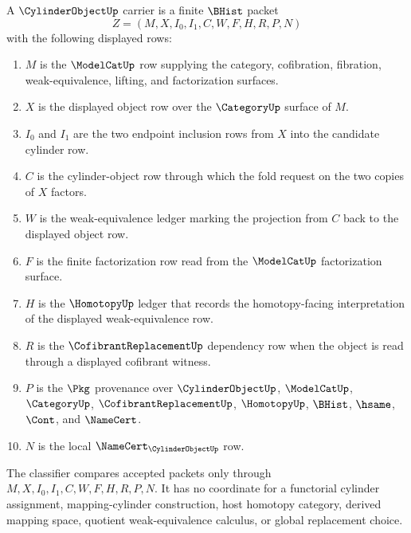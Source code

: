 \begin{definition}
\label{def:cylinder-object-carrier}
A $\CylinderObjectUp$ carrier is a finite $\BHist$ packet
$$
Z=(M,X,I_0,I_1,C,W,F,H,R,P,N)
$$
with the following displayed rows:
\begin{enumerate}
\item $M$ is the $\ModelCatUp$ row supplying the category, cofibration, fibration, weak-equivalence, lifting, and factorization surfaces.
\item $X$ is the displayed object row over the $\CategoryUp$ surface of $M$.
\item $I_0$ and $I_1$ are the two endpoint inclusion rows from $X$ into the candidate cylinder row.
\item $C$ is the cylinder-object row through which the fold request on the two copies of $X$ factors.
\item $W$ is the weak-equivalence ledger marking the projection from $C$ back to the displayed object row.
\item $F$ is the finite factorization row read from the $\ModelCatUp$ factorization surface.
\item $H$ is the $\HomotopyUp$ ledger that records the homotopy-facing interpretation of the displayed weak-equivalence row.
\item $R$ is the $\CofibrantReplacementUp$ dependency row when the object is read through a displayed cofibrant witness.
\item $P$ is the $\Pkg$ provenance over $\CylinderObjectUp$, $\ModelCatUp$, $\CategoryUp$, $\CofibrantReplacementUp$, $\HomotopyUp$, $\BHist$, $\hsame$, $\Cont$, and $\NameCert$.
\item $N$ is the local $\NameCert_{\CylinderObjectUp}$ row.
\end{enumerate}
The classifier compares accepted packets only through $M,X,I_0,I_1,C,W,F,H,R,P,N$. It has no coordinate for a functorial cylinder assignment, mapping-cylinder construction, host homotopy category, derived mapping space, quotient weak-equivalence calculus, or global replacement choice.
\end{definition}

